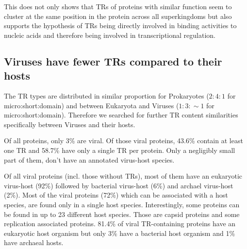\documentclass[a4,center,fleqn]{NAR}
\begin{document}
This does not only shows that TRs of proteins with similar function seem to cluster at the same position in the protein across all superkingdoms 
but also supports the hypothesis of TRs being directly involved in binding activities to nucleic acids and therefore being involved in transcriptional regulation.

\subsection{Viruses have fewer TRs compared to their hosts}
The TR types are distributed in similar proportion for Prokaryotes ($2:4:1$ for micro:short:domain) and between Eukaryota and Viruses ($1:3:\sim 1$ for micro:short:domain). 
Therefore we searched for further TR content similarities specifically between Viruses and their hosts.

Of all proteins, only 3\% are viral. Of those viral proteins, 43.6\% contain at least one TR and 58.7\% have only a single TR per protein. Only a negligibly small part of them, don't have an annotated virus-host species. 

Of all viral proteins (incl. those without TRs), most of them have an eukaryotic virus-host (92\%) followed by bacterial virus-host (6\%) and archael virus-host (2\%).
Most of the viral proteins (72\%) which can be associated with a host species, are found only in a single host species. Interestingly, some proteins can be found in up to 23 different host species. Those are capsid proteins and some replication associated proteins.
81.4\% of viral TR-containing proteins have an eukaryotic host organism but only 3\% have a bacterial host organism and 1\% have archaeal hosts.
\end{document}
